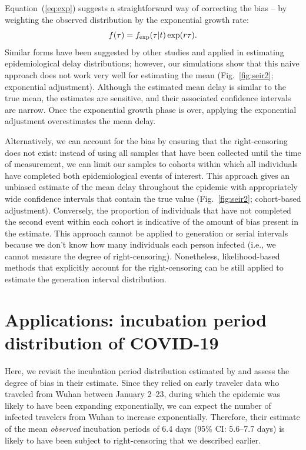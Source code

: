 \documentclass[12pt]{article}
\newcommand{\eref}[1]{(\ref{eq:#1})}
\newcommand{\fref}[1]{Fig.~\ref{fig:#1}}
\begin{document}
Equation~\eref{exp} suggests a straightforward way of correcting the bias -- by weighting the observed distribution by the exponential growth rate:
\begin{equation}
\label{eq:exp}
f(\tau) = f_{\tiny\textrm{exp}}(\tau|t) \exp(r \tau).
\end{equation}
Similar forms have been suggested by other studies and applied in estimating epidemiological delay distributions;
however, our simulations show that this naive approach does not work very well for estimating the mean (\fref{seir2}; exponential adjustment).
Although the estimated mean delay is similar to the true mean, the estimates are sensitive, and their associated confidence intervals are narrow.
Once the exponential growth phase is over, applying the exponential adjustment overestimates the mean delay.

Alternatively, we can account for the bias by ensuring that the right-censoring does not exist:
instead of using all samples that have been collected until the time of measurement, we can limit our samples to cohorts within which all individuals have completed both epidemiological events of interest.
This approach gives an unbiased estimate of the mean delay throughout the epidemic with appropriately wide confidence intervals that contain the true value (\fref{seir2}; cohort-based adjustment).
Conversely, the proportion of individuals that have not completed the second event within each cohort is indicative of the amount of bias present in the estimate.
This approach cannot be applied to generation or serial intervals because we don't know how many individuals each person infected (i.e., we cannot measure the degree of right-censoring).
Nonetheless, likelihood-based methods that explicitly account for the right-censoring can be still applied to estimate the generation interval distribution.

\section{Applications: incubation period distribution of COVID-19}

Here, we revisit the incubation period distribution estimated by \cite{backer2020incubation} and assess the degree of bias in their estimate.
Since they relied on early traveler data who traveled from Wuhan between January 2--23, during which the epidemic was likely to have been expanding exponentially, we can expect the number of infected travelers from Wuhan to increase exponentially.
Therefore, their estimate of the mean \emph{observed} incubation periods of 6.4 days (95\% CI: 5.6–7.7 days) is likely to have been subject to right-censoring that we described earlier.
\end{document}
